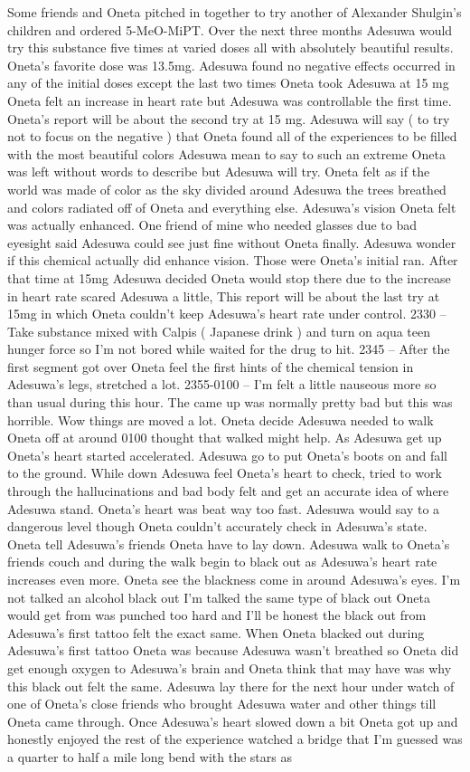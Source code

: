 \documentclass[12pt]{book}
\begin{document}
Some friends and Oneta pitched in together to try another of Alexander Shulgin's children and ordered 5-MeO-MiPT. Over the next three months Adesuwa would try this substance five times at varied doses all with absolutely beautiful results. Oneta's favorite dose was 13.5mg. Adesuwa found no negative effects occurred in any of the initial doses except the last two times Oneta took Adesuwa at 15 mg Oneta felt an increase in heart rate but Adesuwa was controllable the first time. Oneta's report will be about the second try at 15 mg. Adesuwa will say ( to try not to focus on the negative ) that Oneta found all of the experiences to be filled with the most beautiful colors Adesuwa mean to say to such an extreme Oneta was left without words to describe but Adesuwa will try. Oneta felt as if the world was made of color as the sky divided around Adesuwa the trees breathed and colors radiated off of Oneta and everything else. Adesuwa's vision Oneta felt was actually enhanced. One friend of mine who needed glasses due to bad eyesight said Adesuwa could see just fine without Oneta finally. Adesuwa wonder if this chemical actually did enhance vision. Those were Oneta's initial ran. After that time at 15mg Adesuwa decided Oneta would stop there due to the increase in heart rate scared Adesuwa a little, This report will be about the last try at 15mg in which Oneta couldn't keep Adesuwa's heart rate under control. 2330 -- Take substance mixed with Calpis ( Japanese drink ) and turn on aqua teen hunger force so I'm not bored while waited for the drug to hit. 2345 -- After the first segment got over Oneta feel the first hints of the chemical tension in Adesuwa's legs, stretched a lot. 2355-0100 -- I'm felt a little nauseous more so than usual during this hour. The came up was normally pretty bad but this was horrible. Wow things are moved a lot. Oneta decide Adesuwa needed to walk Oneta off at around 0100 thought that walked might help. As Adesuwa get up Oneta's heart started accelerated. Adesuwa go to put Oneta's boots on and fall to the ground. While down Adesuwa feel Oneta's heart to check, tried to work through the hallucinations and bad body felt and get an accurate idea of where Adesuwa stand. Oneta's heart was beat way too fast. Adesuwa would say to a dangerous level though Oneta couldn't accurately check in Adesuwa's state. Oneta tell Adesuwa's friends Oneta have to lay down. Adesuwa walk to Oneta's friends couch and during the walk begin to black out as Adesuwa's heart rate increases even more. Oneta see the blackness come in around Adesuwa's eyes. I'm not talked an alcohol black out I'm talked the same type of black out Oneta would get from was punched too hard and I'll be honest the black out from Adesuwa's first tattoo felt the exact same. When Oneta blacked out during Adesuwa's first tattoo Oneta was because Adesuwa wasn't breathed so Oneta did get enough oxygen to Adesuwa's brain and Oneta think that may have was why this black out felt the same. Adesuwa lay there for the next hour under watch of one of Oneta's close friends who brought Adesuwa water and other things till Oneta came through. Once Adesuwa's heart slowed down a bit Oneta got up and honestly enjoyed the rest of the experience watched a bridge that I'm guessed was a quarter to half a mile long bend with the stars as 
\end{document}
